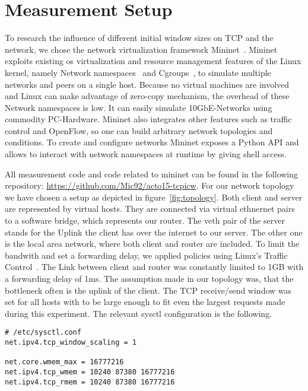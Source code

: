 \section{Measurement Setup}
\label{sec:measurement_setup}

To research the influence of different initial window sizes on TCP and the
network, we chose the network virtualization framework Mininet~\cite{mininet}.
Mininet exploits existing os virtualization and resource management features of
the Linux kernel, namely Network namespaces~\cite{network_namespaces} and
Cgroups~\cite{cgroups}, to simulate multiple networks and peers on a single
host. Because no virtual machines are involved and Linux can make advantage of
zero-copy mechanism, the overhead of these Network namespaces is low. It can
easily simulate 10GbE-Networks using commodity PC-Hardware. Mininet also
integrates other features such as traffic control and OpenFlow, so one can build
arbitrary network topologies and conditions. To create and configure networks
Mininet exposes a Python API and allows to interact with network namespaces at
runtime by giving shell access.



All measurement code and code related to mininet can be found in the following
repository: \url{https://github.com/Mic92/acto15-tcpicw}. For our network
topology we have chosen a setup as depicted in figure~\ref{fig:topology}. Both
client and server are represented by virtual hosts. They are connected via
virtual ethnernet pairs to a software bridge, which represents our router. The
veth pair of the server stands for the Uplink the client has over the internet
to our server. The other one is the local area network, where both client and
router are included. To limit the bandwith and set a forwarding delay, we
applied policies using Linux's Traffic Control~\cite{tc}. The Link between
client and router was constantly limited to 1GB with a forwarding delay of 1ms.
The assumption made in our topology was, that the bottleneck often is the uplink
of the client. The TCP receive/send window was set for all hosts with to be
large enough to fit even the largest requests made during this experiment. The
relevant sysctl configuration is the following.

\begin{lstlisting}
# /etc/sysctl.conf
net.ipv4.tcp_window_scaling = 1

net.core.wmem_max = 16777216
net.ipv4.tcp_wmem = 10240 87380 16777216
net.ipv4.tcp_rmem = 10240 87380 16777216
\end{lstlisting}

